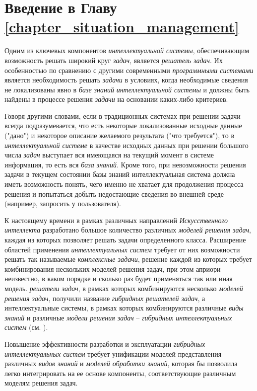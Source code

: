 \section*{Введение в Главу \ref{chapter_situation_management}}

Одним из ключевых компонентов \textit{интеллектуальной системы}, обеспечивающим возможность решать широкий круг \textit{задач}, является \textit{решатель задач}. Их особенностью по сравнению с другими современными \textit{программными системами} является необходимость решать \textit{задачи} в условиях, когда необходимые сведения не локализованы явно в \textit{базе знаний} \textit{интеллектуальной системы} и должны быть найдены в процессе решения \textit{задачи} на основании каких-либо критериев. 

Говоря другими словами, если в традиционных системах при решении задачи всегда подразумевается, что есть некоторые локализованные исходные данные ("дано") и некоторое описание желаемого результата ("что требуется"), то в \textit{интеллектуальной системе} в качестве исходных данных при решении большого числа \textit{задач} выступает вся имеющаяся на текущий момент в системе информация, то есть вся \textit{база знаний}. Кроме того, при невозможности решения задачи в текущем состоянии базы знаний интеллектуальная система должна иметь возможность понять, чего именно не хватает для продолжения процесса решения и попытаться добыть недостающие сведения во внешней среде (например, запросить у пользователя).

К настоящему времени в рамках различных направлений \textit{Искусственного интеллекта} разработано большое количество различных \textit{моделей решения задач}, каждая из которых позволяет решать задачи определенного класса. Расширение областей применения \textit{интеллектуальных систем} требует от них возможности решать так называемые \textit{комплексные задачи}, решение каждой из которых требует комбинирования нескольких моделей решения задач, при этом априори неизвестно, в каком порядке и сколько раз будет применяться так или иная модель. \textit{решатели задач}, в рамках которых комбинируются несколько \textit{моделей решения задач}, получили название \textit{гибридных решателей задач}, а интеллектуальные системы, в рамках которых комбинируются различные \textit{виды знаний} и различные \textit{модели решения задач} -- \textit{гибридных интеллектуальных систем} (см. ).

Повышение эффективности разработки и эксплуатации \textit{гибридных интеллектуальных систем} требует унификации моделей представления различных \textit{видов знаний} и \textit{моделей обработки знаний}, которая бы позволила легко интегрировать на ее основе компоненты, соответствующие различным моделям решения задач.


